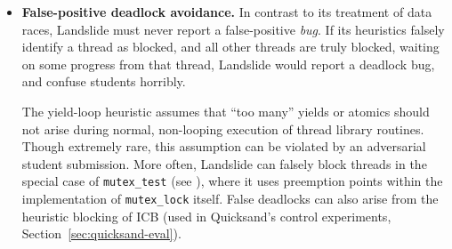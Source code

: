 \begin{itemize}
\begin{itemize}
				the estimator would have included that potential subtree in its computation of how much unexplored state space exists.
				Accordingly, in this case Landslide will invert the estimation algorithm,
				including propagating the reduced subtree size all the way to the state space's root.
				\footnote{Implemented in {\tt untag\_blocked\_branch} in {\tt estimate.c}.}
			\llitem Landslide can precisely identify when another thread may trigger the yield-blocking one to fall out of its loop,
				by analyzing the shared memory conflicts involving only accesses performed in the loop.
				At any such memory conflict, Landslide will reenable the yielding thread.
				(If the other thread's access does not fulfill the yielding thread's wait condition,
				the latter will just re-trigger the heuristic and become blocked again.)
				\footnote{Implemented in {\tt check\_unblock\_yield\_loop} in {\tt user\_sync.c}.}
		\end{itemize}
		This approach is similar to the Fair-Bounded Search algorithm in \cite{bpor},
		although it avoids a major assumption of the latter (threads {\tt yield} if and only if not making progress),
		and also avoids the need to iteratively deepen the yield bound by fixing it as a heuristic constant.
	\item {\bf False-positive deadlock avoidance.}
		In contrast to its treatment of data races, Landslide must never report a false-positive {\em bug}.
		If its heuristics falsely identify a thread as blocked, and all other threads are truly blocked,
		waiting on some progress from that thread, Landslide would report a deadlock bug,
		and confuse students horribly.

		The yield-loop heuristic assumes that ``too many'' yields or atomics should not arise during normal, non-looping execution of thread library routines.
		Though extremely rare, this assumption can be violated by an adversarial student submission.
		More often, Landslide can falsely block threads in the special case of {\tt mutex\_test} (see \cite{quicksand}),
		where it uses preemption points within the implementation of {\tt mutex\_lock} itself.
		False deadlocks can also arise from the heuristic blocking of ICB \cite{chess-icb}
		(used in Quicksand's control experiments, Section~\ref{sec:quicksand-eval}).


\end{itemize}
